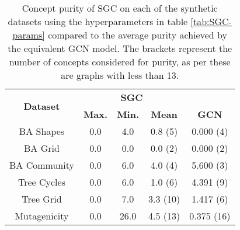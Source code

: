 \begin{table}
    \centering
    \begin{tabular}{c|ccc|c}
        \multirow{2}{*}{\textbf{Dataset}} &
        \multicolumn{3}{c}{\textbf{SGC}} & \\
        & \textbf{Max.} & \textbf{Min.} & \textbf{Mean} & \multirow{-2}{*}{\textbf{GCN}}\\
        \midrule
        BA Shapes       & 0.0 & 4.0 & 0.8 (5) & 0.000 (4) \\
        BA Grid         & 0.0 & 0.0 & 0.0 (2) & 0.000 (2) \\
        BA Community    & 0.0 & 6.0 & 4.0 (4) & 5.600 (3) \\
        Tree Cycles     & 0.0 & 6.0 & 1.0 (6) & 4.391 (9) \\
        Tree Grid       & 0.0 & 7.0 & 3.3 (10) & 1.417 (6) \\
        \midrule
        Mutagenicity    & 0.0 & 26.0 & 4.5 (13) & 0.375 (16) \\
    \end{tabular}
    \caption{Concept purity of SGC on each of the synthetic datasets using the hyperparameters in table \ref{tab:SGC-params} compared to the average purity achieved by the equivalent GCN model. The brackets represent the number of concepts considered for purity, as per  these are graphs with less than 13.}
    \label{tab:SGC-purity}
\end{table}

